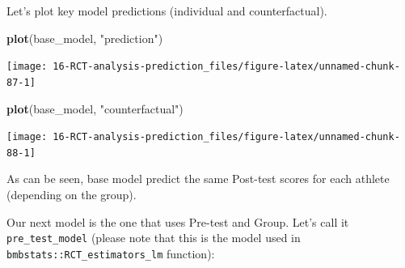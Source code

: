 \documentclass[
]{book}
\newenvironment{Shaded}{\begin{snugshade}}{\end{snugshade}}
\newcommand{\KeywordTok}[1]{\textcolor[rgb]{0.13,0.29,0.53}{\textbf{#1}}}
\newcommand{\NormalTok}[1]{#1}
\newcommand{\StringTok}[1]{\textcolor[rgb]{0.31,0.60,0.02}{#1}}
\begin{document}
Let's plot key model predictions (individual and counterfactual).

\begin{Shaded}
\begin{Highlighting}[]
\KeywordTok{plot}\NormalTok{(base\_model, }\StringTok{"prediction"}\NormalTok{)}
\end{Highlighting}
\end{Shaded}

\begin{center}\texttt{[image: 16-RCT-analysis-prediction\_files/figure-latex/unnamed-chunk-87-1]} \end{center}

\begin{Shaded}
\begin{Highlighting}[]
\KeywordTok{plot}\NormalTok{(base\_model, }\StringTok{"counterfactual"}\NormalTok{)}
\end{Highlighting}
\end{Shaded}

\begin{center}\texttt{[image: 16-RCT-analysis-prediction\_files/figure-latex/unnamed-chunk-88-1]} \end{center}

As can be seen, base model predict the same Post-test scores for each athlete (depending on the group).

Our next model is the one that uses Pre-test and Group. Let's call it \texttt{pre\_test\_model} (please note that this is the model used in \texttt{bmbstats::RCT\_estimators\_lm} function):
\end{document}
